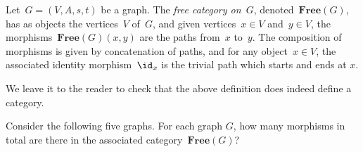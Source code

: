 \begin{ctdefinition}
  Let~$G=(V,A,s,t)$ be a graph. The \emph{free category on~$G$}, denoted~$\mathbf{Free}(G)$, has as objects the vertices~$V$ of~$G$, and given vertices~$x\in V$ and~$y\in V$, the morphisms~$\mathbf{Free}(G)(x,y)$ are the paths from~$x$ to~$y$.
  The composition of morphisms is given by concatenation of paths, and for any object~$x \in V$, the associated identity morphism~$\id_x$ is the trivial path which starts and ends at $x$.
\end{ctdefinition}



We leave it to the reader to check that the above definition does indeed define a category.




\begin{exercise}
  Consider the following five graphs. For each graph $G$, how many morphisms in total are there in the associated category~$\mathbf{Free}(G)$?

  \begin{center}
  \end{center}
\end{exercise}

